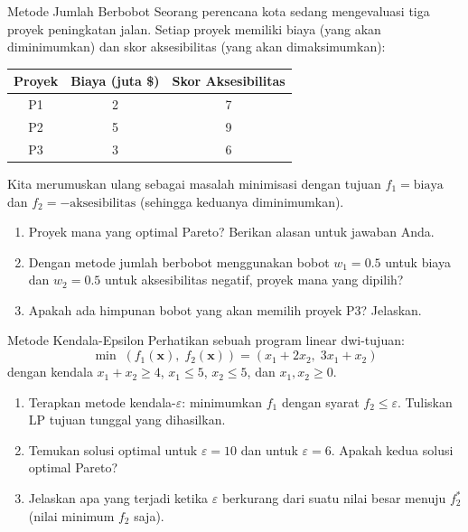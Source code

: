 \begin{ex}{Metode Jumlah Berbobot}{}
\label{ex:weighted-sum-projects}
Seorang perencana kota sedang mengevaluasi tiga proyek peningkatan jalan. Setiap proyek memiliki biaya (yang akan diminimumkan) dan skor aksesibilitas (yang akan dimaksimumkan):

\begin{center}
\begin{tabular}{c|c|c}
\textbf{Proyek} & \textbf{Biaya (juta \$)} & \textbf{Skor Aksesibilitas} \\
\hline
P1 & 2 & 7 \\
P2 & 5 & 9 \\
P3 & 3 & 6 \\
\end{tabular}
\par{}\label{tab:multi-objective-optimization_updated-tab03}%

\end{center}

Kita merumuskan ulang sebagai masalah minimisasi dengan tujuan $f_1 = \text{biaya}$ dan $f_2 = -\text{aksesibilitas}$ (sehingga keduanya diminimumkan).

\begin{enumerate}
\item Proyek mana yang optimal Pareto? Berikan alasan untuk jawaban Anda.
\item Dengan metode jumlah berbobot menggunakan bobot $w_1 = 0.5$ untuk biaya dan $w_2 = 0.5$ untuk aksesibilitas negatif, proyek mana yang dipilih?
\item Apakah ada himpunan bobot yang akan memilih proyek P3? Jelaskan.
\end{enumerate}
\end{ex}

\begin{ex}{Metode Kendala-Epsilon}{}
\label{ex:eps-constraint-lp}
Perhatikan sebuah program linear dwi-tujuan:
\[
\min \; (f_1(\mathbf{x}), \; f_2(\mathbf{x})) = (x_1 + 2x_2, \; 3x_1 + x_2)
\]
dengan kendala $x_1 + x_2 \geq 4$, $x_1 \leq 5$, $x_2 \leq 5$, dan $x_1, x_2 \geq 0$.

\begin{enumerate}
\item Terapkan metode kendala-$\varepsilon$: minimumkan $f_1$ dengan syarat $f_2 \leq \varepsilon$. Tuliskan LP tujuan tunggal yang dihasilkan.
\item Temukan solusi optimal untuk $\varepsilon = 10$ dan untuk $\varepsilon = 6$. Apakah kedua solusi optimal Pareto?
\item Jelaskan apa yang terjadi ketika $\varepsilon$ berkurang dari suatu nilai besar menuju $f_2^*$ (nilai minimum $f_2$ saja).
\end{enumerate}
\end{ex}

